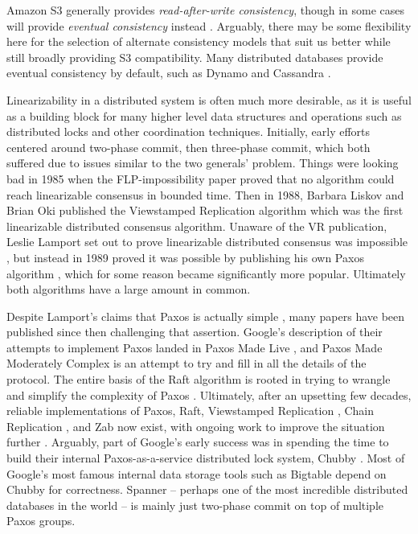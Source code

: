 \documentclass[a4paper,10pt]{article} \usepackage[utf8]{inputenc}
\begin{document}
Amazon S3 generally provides {\em read-after-write consistency}, though in some
cases will provide {\em eventual consistency} instead \cite{s3-consistency}.
Arguably, there may be some flexibility here for the selection of alternate
consistency models that suit us better while still broadly providing S3
compatibility. Many distributed databases provide eventual consistency by
default, such as Dynamo \cite{dynamo} and Cassandra \cite{cassandra}.

Linearizability in a distributed system is often much more desirable, as it is
useful as a building block for many higher level data structures and operations
such as distributed locks and other coordination techniques. Initially, early
efforts centered around two-phase commit, then three-phase commit, which both
suffered due to issues similar to the two generals' problem. Things were looking
bad in 1985 when the FLP-impossibility paper \cite{flp} proved that no algorithm
could reach linearizable consensus in bounded time. Then in 1988, Barbara Liskov
and Brian Oki published the Viewstamped Replication algorithm \cite{vr} which
was the first linearizable distributed consensus algorithm. Unaware of the VR
publication, Leslie Lamport set out to prove linearizable distributed consensus
was impossible \cite{paxos-note}, but instead in 1989 proved it was possible by
publishing his own Paxos algorithm \cite{paxos}, which for some reason became
significantly more popular. Ultimately both algorithms have a large amount in
common.

Despite Lamport's claims that Paxos is actually simple \cite{paxos-simple},
many papers have been published since then
challenging that assertion. Google's description of their attempts to implement
Paxos landed in Paxos Made Live \cite{paxos-live}, and Paxos Made Moderately
Complex \cite{paxos-complex} is an attempt to try and fill in all the details of
the protocol. The entire basis of the Raft algorithm is rooted in trying to
wrangle and simplify the complexity of Paxos \cite{raft}. Ultimately, after an
upsetting few decades, reliable implementations of Paxos, Raft, Viewstamped
Replication \cite{vrr}, Chain Replication \cite{chain-rep}, and Zab \cite{zab}
now exist, with ongoing work to improve the situation
further \cite{epaxos,paxos-flexible}. Arguably, part of Google's early success
was in spending the time to build their internal Paxos-as-a-service distributed
lock system, Chubby \cite{chubby}. Most of Google's most famous internal data
storage tools such as Bigtable \cite{bigtable} depend on Chubby for
correctness. Spanner \cite{spanner} -- perhaps one of the most incredible
distributed databases in the world -- is mainly just two-phase commit on top of
multiple Paxos groups.
\end{document}
